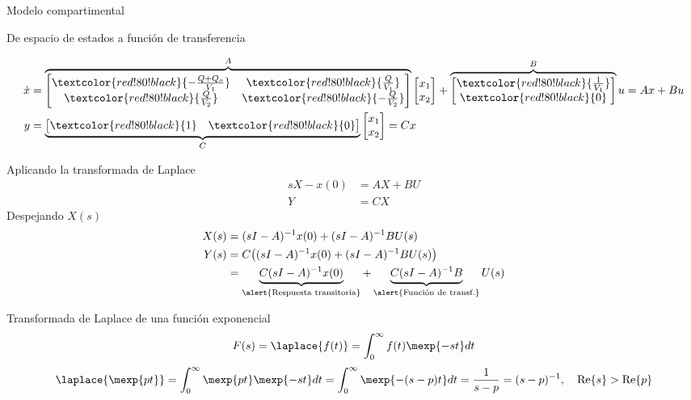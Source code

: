 \documentclass[presentation,aspectratio=1610]{beamer}
\begin{document}
\begin{frame}[label={sec:org9e86773}]{Modelo compartimental}
\begin{center}
\end{center}
\end{frame}





\begin{frame}[label={sec:org7c4bf02}]{De espacio de estados a función de transferencia}
\footnotesize

\begin{align*}
  \dot{x} &= \overbrace{\begin{bmatrix} \textcolor{red!80!black}{-\frac{Q+Q_o}{V_1}}  & \textcolor{red!80!black}{\frac{Q}{V_1}}\\
              \textcolor{red!80!black}{\frac{Q}{V_2}}  & \textcolor{red!80!black}{-\frac{Q}{V_2}}\end{bmatrix}}^A \begin{bmatrix} {x_1}\\ {x_2}\end{bmatrix}  + \overbrace{\begin{bmatrix} \textcolor{red!80!black}{\frac{1}{V_1}} \\ \textcolor{red!80!black}{0} \end{bmatrix}}^B  u  = Ax + Bu\\
       y &=  \underbrace{\begin{bmatrix} \textcolor{red!80!black}{1} &  \textcolor{red!80!black}{0}\end{bmatrix}}_C \begin{bmatrix} x_1\\ x_2\end{bmatrix} = Cx
\end{align*}

Aplicando la transformada de Laplace
\begin{align*}
sX - x(0) &= AX + BU\\
Y &= CX
\end{align*}
\pause
Despejando \(X(s)\)
\begin{align*}
X(s) &= (sI-A)^{-1}x(0) + (sI-A)^{-1}BU(s)\\
Y(s) &= C\big((sI-A)^{-1}x(0) + (sI-A)^{-1}BU(s)\big)\\
     & = \underbrace{C(sI-A)^{-1}x(0)}_{\text{\alert{Respuesta transitoria}}} + \underbrace{C(sI-A)^{-1}B}_{\text{\alert{Función de transf.}}}U(s)
\end{align*}
\end{frame}


\begin{frame}[label={sec:org44750ec}]{Transformada de Laplace de una función exponencial}
\[F(s) = \laplace{f(t)} = \int_0^\infty f(t)\mexp{-st}dt\]
\pause
\[\laplace{\mexp{pt}} = \int_0^\infty \mexp{pt}\mexp{-st}dt = \int_0^\infty \mexp{-(s-p)t}dt = \frac{1}{s-p} = (s-p)^{-1}, \quad \mathrm{Re}\{s\} > \mathrm{Re}\{p\} \]
\end{frame}
\end{document}
